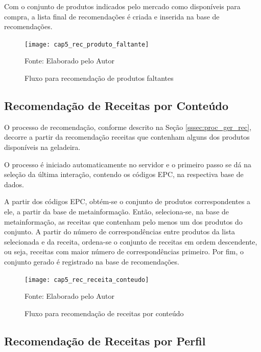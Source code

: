 Com o conjunto de produtos indicados pelo mercado como disponíveis para compra, a lista final de recomendações é criada e inserida na base de recomendações.

\begin{figure}[H]
    \caption{Fluxo para recomendação de produtos faltantes} 
    \label{fig:cap5_rec_produto_faltante}
    \texttt{[image: cap5\_rec\_produto\_faltante]}
    
    \footnotesize{Fonte: Elaborado pelo Autor}
\end{figure}

\subsection{Recomendação de Receitas por Conteúdo}

O processo de recomendação, conforme descrito na Seção \ref{sssec:proc_ger_rec}, decorre a partir da recomendação receitas que contenham alguns dos produtos disponíveis na geladeira. 

O processo é iniciado automaticamente no servidor e o primeiro passo se dá na seleção da última interação, contendo os códigos EPC, na respectiva base de dados.

A partir dos códigos EPC, obtém-se o conjunto de produtos correspondentes a ele, a partir da base de metainformação. Então, seleciona-se, na base de metainformação, as receitas que contenham pelo menos um dos produtos do conjunto. A partir do número de correspondências entre produtos da lista selecionada e da receita, ordena-se o conjunto de receitas em ordem descendente, ou seja, receitas com maior número de correspondências primeiro. Por fim, o conjunto gerado é registrado na base de recomendações.

\begin{figure}[H]
    \caption{Fluxo para recomendação de receitas por conteúdo} 
    \label{fig:cap5_rec_receita_conteudo}
    \texttt{[image: cap5\_rec\_receita\_conteudo]}
    
    \footnotesize{Fonte: Elaborado pelo Autor}
\end{figure}

\subsection{Recomendação de Receitas por Perfil}

